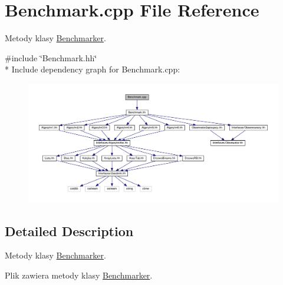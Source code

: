 \hypertarget{a00035}{}\section{Benchmark.\+cpp File Reference}
\label{a00035}


Metody klasy \hyperlink{a00009}{Benchmarker}.  


{\ttfamily \#include \char`\"{}Benchmark.\+hh\char`\"{}}\\*
Include dependency graph for Benchmark.\+cpp\+:
\nopagebreak
\begin{figure}[H]
\begin{center}
\leavevmode
\includegraphics[width=350pt]{a00083}
\end{center}
\end{figure}


\subsection{Detailed Description}
Metody klasy \hyperlink{a00009}{Benchmarker}. 

Plik zawiera metody klasy \hyperlink{a00009}{Benchmarker}. 